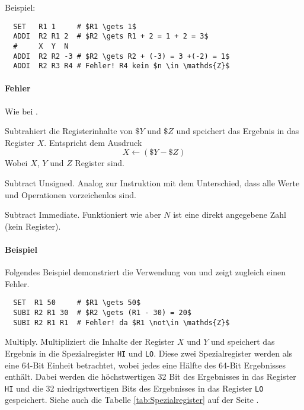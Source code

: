 Beispiel:
\begin{lstlisting}
  SET   R1 1     # $R1 \gets 1$
  ADDI  R2 R1 2  # $R2 \gets R1 + 2 = 1 + 2 = 3$
  #     X  Y  N
  ADDI  R2 R2 -3 # $R2 \gets R2 + (-3) = 3 +(-2) = 1$
  ADDI  R2 R3 R4 # Fehler! R4 kein $n \in \mathds{Z}$
\end{lstlisting}

\paragraph{Fehler}
Wie bei .


Subtrahiert die Registerinhalte von $\$Y$ und $\$Z$ und speichert das Ergebnis
in das Register $X$. Entspricht dem Ausdruck
\[
    X \gets (\$Y - \$Z)
\]
Wobei $X$, $Y$ und $Z$ Register sind.



\glqq Subtract Unsigned\grqq.
Analog zur Instruktion  mit dem Unterschied, dass alle Werte und
Operationen vorzeichenlos sind.



\glqq Subtract Immediate\grqq.
Funktioniert wie  aber $N$ ist eine direkt angegebene Zahl
(kein Register).

\paragraph{Beispiel}
Folgendes Beispiel demonstriert die Verwendung von  und zeigt
zugleich einen Fehler.
\begin{lstlisting}
  SET  R1 50     # $R1 \gets 50$
  SUBI R2 R1 30  # $R2 \gets (R1 - 30) = 20$
  SUBI R2 R1 R1  # Fehler! da $R1 \not\in \mathds{Z}$
\end{lstlisting}



\glqq Multiply\grqq. 
Multipliziert die Inhalte der Register $X$ und $Y$ und speichert das Ergebnis in
die Spezialregister \texttt{HI} und \texttt{LO}. Diese zwei Spezialregister
werden als eine 64-Bit Einheit betrachtet, wobei jedes eine Hälfte des
64-Bit Ergebnisses enthält.
Dabei werden die höchstwertigen 32 Bit des Ergebnisses in das Register
\texttt{HI}
und die 32 niedrigstwertigen Bits des Ergebnisses in das Register
\texttt{LO} gespeichert.
Siehe auch die Tabelle \ref{tab:Spezialregister} auf der Seite
\pageref{tab:Spezialregister}.

